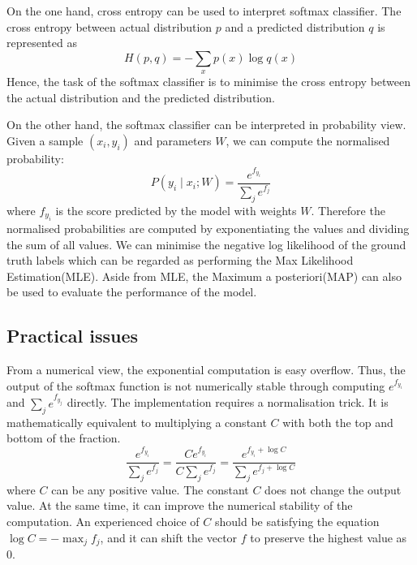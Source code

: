 On the one hand, cross entropy can be used to interpret softmax classifier. The cross entropy between actual  distribution $p$ and a predicted distribution $q$ is represented as
\begin{equation}\label{eq:CrossEntropyDiff}
H(p,q) = - \sum_x p(x) \log q(x)
\end{equation}
Hence, the task of the softmax classifier is to minimise the cross entropy between the actual distribution and the predicted distribution. 

On the other hand, the softmax classifier can be interpreted in probability view. Given a sample $(x_i, y_i)$ and parameters $W$, we can compute the normalised probability:
\begin{equation}\label{eq:ProbInter}
P(y_i \mid x_i; W) = \frac{e^{f_{y_i}}}{\sum_j e^{f_j} }
\end{equation}
where $f_{y_i}$ is the score predicted by the model with weights $W$. Therefore the normalised probabilities are computed by exponentiating the values and dividing the sum of all values. We can minimise the negative log likelihood of the ground truth labels which can be regarded as performing the Max Likelihood Estimation(MLE). Aside from MLE, the Maximum a posteriori(MAP) can also be used to evaluate the performance of the model.

\subsection{Practical issues}

From a numerical view, the exponential computation is easy overflow. Thus, the output of the softmax function is not numerically stable through computing $e^{f_{y_i}}$ and $\sum_j e^{f_{y_j}}$ directly. The implementation requires a normalisation trick. It is mathematically equivalent to multiplying a constant $C$ with both the top and bottom of the fraction.
\begin{equation}\label{eq:SoftmaxTricks}
\frac{e^{f_{y_i}}}{\sum_j e^{f_j}}
= \frac{Ce^{f_{y_i}}}{C\sum_j e^{f_j}}
= \frac{e^{f_{y_i} + \log C}}{\sum_j e^{f_j + \log C}}
\end{equation}
where $C$ can be any positive value. The constant $C$ does not change the output value. At the same time, it can improve the numerical stability of the computation. An experienced choice of $C$ should be satisfying the equation $\log C = -\max_j f_j$, and it can shift the vector $f$ to preserve the highest value as $0$.

